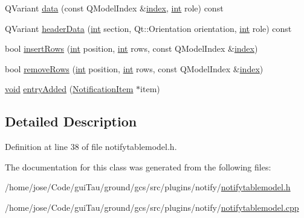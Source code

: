 \begin{DoxyCompactItemize}
\item 
Q\-Variant \hyperlink{group__notifyplugin_gacf622323e5cab0f1ecdeb6d35e4b8039}{data} (const Q\-Model\-Index \&\hyperlink{glext_8h_ab47dd9958bcadea08866b42bf358e95e}{index}, \hyperlink{ioapi_8h_a787fa3cf048117ba7123753c1e74fcd6}{int} role) const 
\item 
Q\-Variant \hyperlink{group__notifyplugin_gab211bb28323ebcede08ef838bc6b2789}{header\-Data} (\hyperlink{ioapi_8h_a787fa3cf048117ba7123753c1e74fcd6}{int} section, Qt\-::\-Orientation orientation, \hyperlink{ioapi_8h_a787fa3cf048117ba7123753c1e74fcd6}{int} role) const 
\item 
bool \hyperlink{group__notifyplugin_ga989fe66cec593e3ae8a3715160d4db33}{insert\-Rows} (\hyperlink{ioapi_8h_a787fa3cf048117ba7123753c1e74fcd6}{int} position, \hyperlink{ioapi_8h_a787fa3cf048117ba7123753c1e74fcd6}{int} rows, const Q\-Model\-Index \&\hyperlink{glext_8h_ab47dd9958bcadea08866b42bf358e95e}{index})
\item 
bool \hyperlink{group__notifyplugin_ga3e038f81c56a42999341a5704f703dd3}{remove\-Rows} (\hyperlink{ioapi_8h_a787fa3cf048117ba7123753c1e74fcd6}{int} position, \hyperlink{ioapi_8h_a787fa3cf048117ba7123753c1e74fcd6}{int} rows, const Q\-Model\-Index \&\hyperlink{glext_8h_ab47dd9958bcadea08866b42bf358e95e}{index})
\item 
\hyperlink{group___u_a_v_objects_plugin_ga444cf2ff3f0ecbe028adce838d373f5c}{void} \hyperlink{group__notifyplugin_gaa28f89364ed3f06a9e1ab36b51216b65}{entry\-Added} (\hyperlink{class_notification_item}{Notification\-Item} $\ast$item)
\end{DoxyCompactItemize}


\subsection{Detailed Description}


Definition at line 38 of file notifytablemodel.\-h.



The documentation for this class was generated from the following files\-:\begin{DoxyCompactItemize}
\item 
/home/jose/\-Code/gui\-Tau/ground/gcs/src/plugins/notify/\hyperlink{notifytablemodel_8h}{notifytablemodel.\-h}\item 
/home/jose/\-Code/gui\-Tau/ground/gcs/src/plugins/notify/\hyperlink{notifytablemodel_8cpp}{notifytablemodel.\-cpp}\end{DoxyCompactItemize}
